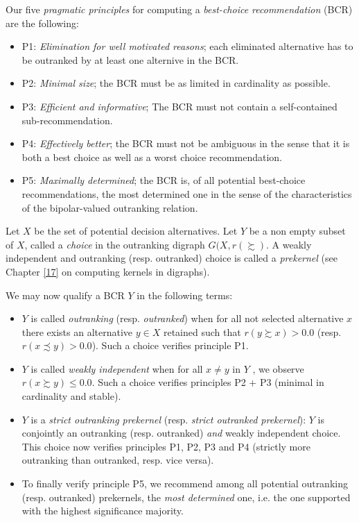 Our five \emph{pragmatic principles} for computing a \emph{best-choice recommendation} (BCR) are the following:
\begin{itemize}
\item [] P1: \emph{Elimination for well motivated reasons}; each eliminated alternative has to be outranked by at least one alternive in the BCR.
\item [] P2: \emph{Minimal size}; the BCR must be as limited in cardinality as possible.
\item [] P3: \emph{Efficient and informative}; The BCR must not contain a self-contained sub-recommendation.
\item [] P4: \emph{Effectively better}; the BCR must not be ambiguous in the sense that it is both a best choice as well as a worst choice recommendation.
\item [] P5: \emph{Maximally determined}; the BCR is, of all potential best-choice recommendations, the most determined one in the sense of the characteristics of the bipolar-valued outranking relation.
\end{itemize}

Let $X$ be the set of potential decision alternatives. Let $Y$ be a non empty subset of $X$, called a \emph{choice} in the outranking digraph $G(X,r(\succsim )$. A weakly independent and outranking (resp. outranked) choice is called a \emph{prekernel} (see Chapter \ref{17} on computing kernels in digraphs).

We may now qualify a BCR $Y$ in the following terms:
\begin{itemize}
\item $Y$ is called \emph{outranking} (resp. \emph{outranked}) when for all not selected alternative $x$ there exists an alternative $y \in X$ retained such that $r(y \succsim x) > 0.0$ (resp. $r(x \precsim y) > 0.0$). Such a choice verifies principle P1.
\item $Y$ is called \emph{weakly independent} when for all $x \neq y$ in $Y$ , we observe $r(x \succsim y) \leq 0.0$. Such a choice verifies principles P2 + P3 (minimal in cardinality and stable).
\item $Y$ is a \emph{strict outranking prekernel} (resp. \emph{strict outranked prekernel}): $Y$ is conjointly an outranking (resp. outranked) \emph{and} weakly independent choice. This choice now verifies principles P1, P2, P3 and P4 (strictly more outranking than outranked, resp. vice versa).
\item To finally verify principle P5, we recommend among all potential outranking (resp. outranked) prekernels, the \emph{most determined} one, i.e. the one supported with the highest significance majority.
\end{itemize}

